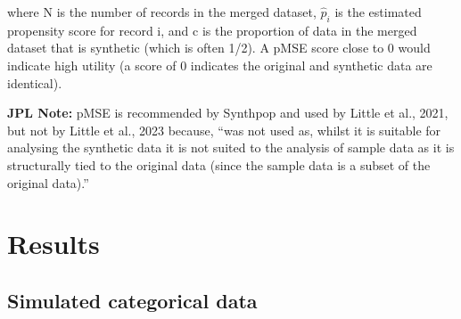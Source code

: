 \documentclass[t,10pt,utfx8]{beamer}
\begin{document}
\begin{spacing}{1.25}
{where N is the number of records in the merged dataset, $\hat{p}_i$ is the estimated propensity score for record i, and c is the proportion of data in the merged dataset that is synthetic (which is often 1/2). A pMSE score close to 0 would indicate high utility (a score of 0 indicates the original and synthetic data are identical). 

{\bf JPL Note:} pMSE is recommended by Synthpop and used by Little et al., 2021, but not by Little et al., 2023 because, ``was not used as, whilst it is suitable for analysing the synthetic data it is not suited to the analysis of sample data as it is structurally tied to the original data (since the sample data is a subset of the original data).''
}


\section{Results}\label{sec_results}
\subsection{Simulated categorical data}\label{sec_results_categorical}





\end{spacing}
\end{document}
